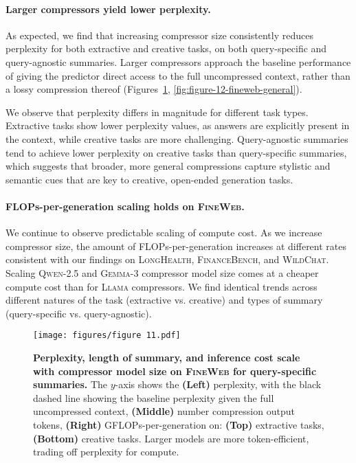 \documentclass{article} %
\begin{document}
\paragraph*{Larger compressors yield lower perplexity.} 
As expected, we find that increasing compressor size consistently reduces perplexity for both extractive and creative tasks, on both query-specific and query-agnostic summaries. Larger compressors approach the baseline performance of giving the predictor direct access to the full uncompressed context, rather than a lossy compression thereof (Figures~\ref{fig:figure-12-fineweb-question-specific}, \ref{fig:figure-12-fineweb-general}). 

We observe that perplexity differs in magnitude for different task types. Extractive tasks show lower perplexity values, as answers are explicitly present in the context, while creative tasks are more challenging. Query-agnostic summaries tend to achieve lower perplexity on creative tasks than query-specific summaries, which suggests that broader, more general compressions capture stylistic and semantic cues that are key to creative, open-ended generation tasks.

\paragraph*{FLOPs-per-generation scaling holds on \textsc{FineWeb}.} We continue to observe predictable scaling of compute cost. As we increase compressor size, the amount of FLOPs-per-generation increases at different rates consistent with our findings on \textsc{LongHealth}, \textsc{FinanceBench}, and \textsc{WildChat}. Scaling \textsc{Qwen-2.5} and \textsc{Gemma-3} compressor model size comes at a cheaper compute cost than for \textsc{Llama} compressors. We find identical trends across different natures of the task (extractive vs. creative) and types of summary (query-specific vs. query-agnostic). 

\begin{figure}[h!]
    \centering
    \texttt{[image: figures/figure 11.pdf]}
    \caption{\textbf{Perplexity, length of summary, and inference cost scale with compressor model size on \textsc{FineWeb} for query-specific summaries.} The $y$-axis shows the \textbf{(Left)} perplexity, with the black dashed line showing the baseline perplexity given the full uncompressed context, \textbf{(Middle)} number compression output tokens, \textbf{(Right)} GFLOPs-per-generation on: \textbf{(Top)} extractive tasks, \textbf{(Bottom)} creative tasks. Larger models are more token-efficient, trading off perplexity for compute.}
    \label{fig:figure-12-fineweb-question-specific}
\end{figure}
\end{document}
